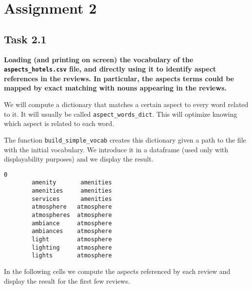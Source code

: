 \documentclass[11pt]{article}
\makeatletter
\newcommand{\boxspacing}{\kern\kvtcb@left@rule\kern\kvtcb@boxsep}
\newcommand{\prompt}[4]{
        {\ttfamily\llap{{\color{#2}[#3]:\hspace{3pt}#4}}\vspace{-\baselineskip}}
    }
\makeatother
\begin{document}
\hypertarget{assignment-2}{%
    \section{Assignment 2}\label{assignment-2}}

\hypertarget{task-2.1}{%
    \subsection{Task 2.1}\label{task-2.1}}

\textbf{Loading (and printing on screen) the vocabulary of the
    \texttt{aspects\_hotels.csv} file, and directly using it to identify
    aspect references in the reviews. In particular, the aspects terms could
    be mapped by exact matching with nouns appearing in the reviews.}

We will compute a dictionary that matches a certain aspect to every word
related to it. It will usually be called \texttt{aspect\_words\_dict}.
This will optimize knowing which aspect is related to each word.

The function \texttt{build\_simple\_vocab} creates this dictionary given
a path to the file with the initial vocabulary. We introduce it in a
dataframe (used only with displayability purposes) and we display the
result.

\begin{tcolorbox}[breakable, size=fbox, boxrule=.5pt, pad at break*=1mm, opacityfill=0]
    \prompt{Out}{outcolor}{3}{\boxspacing}
    \begin{Verbatim}[commandchars=\\\{\}]
        0
        amenity       amenities
        amenities     amenities
        services      amenities
        atmosphere   atmosphere
        atmospheres  atmosphere
        ambiance     atmosphere
        ambiances    atmosphere
        light        atmosphere
        lighting     atmosphere
        lights       atmosphere
    \end{Verbatim}
\end{tcolorbox}

In the following cells we compute the aspects referenced by each review
and display the result for the first few reviews.
\end{document}
